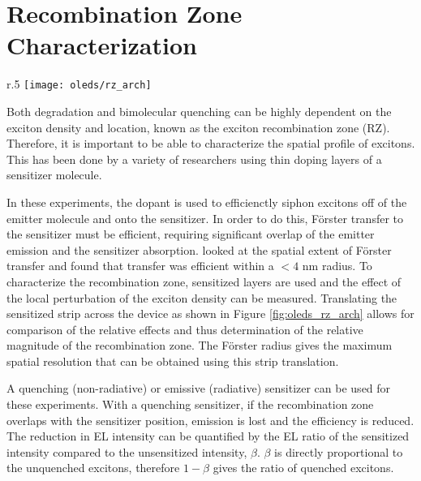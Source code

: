 \documentclass[../thesis.tex]{subfiles}
\begin{document}
\section{Recombination Zone Characterization}\label{sec:rz_measurement}
\begin{wrapfigure}{r}{.5\textwidth}
\texttt{[image: oleds/rz\_arch]}
\caption{Recombination zone measurement architecture.  The curly brace indicates the device stack.  Figure taken from \textcite{Erickson2013a}}
\label{fig:oleds_rz_arch}
\end{wrapfigure}
Both degradation and bimolecular quenching can be highly dependent on the exciton density and location, known as the exciton recombination zone (RZ).\supercite{Giebink2006,Giebink2008a,Giebink2008c,Giebink2009a,Reineke2007,Hershey2016,Hershey2017,Bangsund2018}
Therefore, it is important to be able to characterize the spatial profile of excitons.
This has been done by a variety of researchers using thin doping layers of a sensitizer molecule.\supercite{Reineke2007a,Coburn2016a,Coburn2017,Erickson2013a,Hershey2017,Bangsund2018}

In these experiments, the dopant is used to efficienctly siphon excitons off of the emitter molecule and onto the sensitizer.
In order to do this, F\"{o}rster transfer to the sensitizer must be efficient, requiring significant overlap of the emitter emission and the sensitizer absorption.
\textcite{Erickson2013a} looked at the spatial extent of F\"{o}rster transfer and found that transfer was efficient within a $<4$ nm radius.
To characterize the recombination zone, sensitized layers are used and the effect of the local perturbation of the exciton density can be measured.
Translating the sensitized strip across the device as shown in Figure \ref{fig:oleds_rz_arch} allows for comparison of the relative effects and thus determination of the relative magnitude of the recombination zone.
The F\"{o}rster radius gives the maximum spatial resolution that can be obtained using this strip translation.

A quenching (non-radiative) or emissive (radiative) sensitizer can be used for these experiments.
With a quenching sensitizer, if the recombination zone overlaps with the sensitizer position, emission is lost and the efficiency is reduced.
The reduction in EL intensity can be quantified by the EL ratio of the sensitized intensity compared to the unsensitized intensity, $\beta$.
$\beta$ is directly proportional to the unquenched excitons, therefore $1-\beta$ gives the ratio of quenched excitons.
\end{document}
